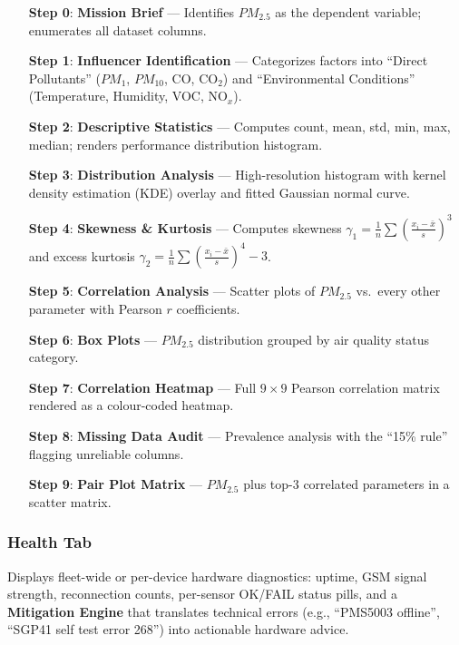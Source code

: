 \documentclass[12pt,a4paper]{article}
\begin{document}
\begin{enumerate}[nosep]
    \item[\textbf{Step 0}:] \textbf{Mission Brief} --- Identifies $PM_{2.5}$ as the dependent variable; enumerates all dataset columns.
    \item[\textbf{Step 1}:] \textbf{Influencer Identification} --- Categorizes factors into ``Direct Pollutants'' ($PM_1$, $PM_{10}$, CO, CO$_2$) and ``Environmental Conditions'' (Temperature, Humidity, VOC, NO$_x$).
    \item[\textbf{Step 2}:] \textbf{Descriptive Statistics} --- Computes count, mean, std, min, max, median; renders performance distribution histogram.
    \item[\textbf{Step 3}:] \textbf{Distribution Analysis} --- High-resolution histogram with kernel density estimation (KDE) overlay and fitted Gaussian normal curve.
    \item[\textbf{Step 4}:] \textbf{Skewness \& Kurtosis} --- Computes skewness $\gamma_1 = \frac{1}{n}\sum\left(\frac{x_i - \bar{x}}{s}\right)^3$ and excess kurtosis $\gamma_2 = \frac{1}{n}\sum\left(\frac{x_i - \bar{x}}{s}\right)^4 - 3$.
    \item[\textbf{Step 5}:] \textbf{Correlation Analysis} --- Scatter plots of $PM_{2.5}$ vs.\ every other parameter with Pearson $r$ coefficients.
    \item[\textbf{Step 6}:] \textbf{Box Plots} --- $PM_{2.5}$ distribution grouped by air quality status category.
    \item[\textbf{Step 7}:] \textbf{Correlation Heatmap} --- Full $9 \times 9$ Pearson correlation matrix rendered as a colour-coded heatmap.
    \item[\textbf{Step 8}:] \textbf{Missing Data Audit} --- Prevalence analysis with the ``15\% rule'' flagging unreliable columns.
    \item[\textbf{Step 9}:] \textbf{Pair Plot Matrix} --- $PM_{2.5}$ plus top-3 correlated parameters in a scatter matrix.
\end{enumerate}

\subsubsection{Health Tab}
Displays fleet-wide or per-device hardware diagnostics: uptime, GSM signal strength, reconnection counts, per-sensor OK/FAIL status pills, and a \textbf{Mitigation Engine} that translates technical errors (e.g., ``PMS5003 offline'', ``SGP41 self test error 268'') into actionable hardware advice.
\end{document}
